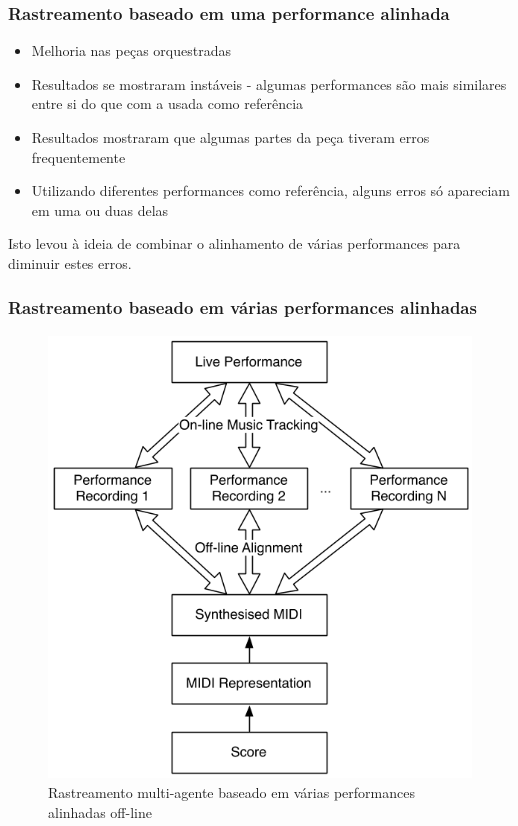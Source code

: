 \documentclass[serif,mathserif]{beamer}
\begin{document}
\begin{frame}
  \frametitle{Rastreamento baseado em uma performance alinhada}
  \begin{itemize}
    \item Melhoria nas peças orquestradas\pause
    \item Resultados se mostraram instáveis - algumas performances são mais similares entre si do que com a usada como referência \pause %
    \item Resultados mostraram que algumas partes da peça tiveram erros frequentemente \pause %
    \item Utilizando diferentes performances como referência, alguns erros só apareciam em uma ou duas delas \pause
  \end{itemize}
  Isto levou à ideia de combinar o alinhamento de várias performances para diminuir estes erros.
\end{frame}

\begin{frame}[label=figura2]
  \frametitle{Rastreamento baseado em várias performances alinhadas}
  \begin{figure}[!ht]
    \centering
    \includegraphics[height=0.7\textheight]{src/img/2-Figure2-1.png}
    \caption*{Rastreamento multi-agente baseado em várias performances alinhadas off-line}
  \end{figure}
\end{frame}
\end{document}
